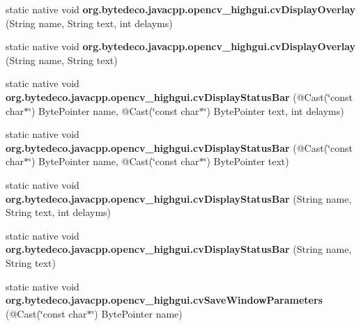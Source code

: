 \begin{DoxyCompactItemize}
\mbox{\label{group__highgui__c_ga0bcf160db70e69d8f716b78eb9a768bb}} 
static native void {\bfseries org.\+bytedeco.\+javacpp.\+opencv\+\_\+highgui.\+cv\+Display\+Overlay} (String name, String text, int delayms)
\item 
\mbox{\label{group__highgui__c_ga0cbee73ab5e6cb1201751f09c27f4425}} 
static native void {\bfseries org.\+bytedeco.\+javacpp.\+opencv\+\_\+highgui.\+cv\+Display\+Overlay} (String name, String text)
\item 
\mbox{\label{group__highgui__c_ga50a2713aef8af8f068cb8eca970b70dc}} 
static native void {\bfseries org.\+bytedeco.\+javacpp.\+opencv\+\_\+highgui.\+cv\+Display\+Status\+Bar} (@Cast(\char`\"{}const char$\ast$\char`\"{}) Byte\+Pointer name, @Cast(\char`\"{}const char$\ast$\char`\"{}) Byte\+Pointer text, int delayms)
\item 
\mbox{\label{group__highgui__c_ga38e4ec523798943980fb7e846dd2cb3c}} 
static native void {\bfseries org.\+bytedeco.\+javacpp.\+opencv\+\_\+highgui.\+cv\+Display\+Status\+Bar} (@Cast(\char`\"{}const char$\ast$\char`\"{}) Byte\+Pointer name, @Cast(\char`\"{}const char$\ast$\char`\"{}) Byte\+Pointer text)
\item 
\mbox{\label{group__highgui__c_ga19067247a51582fb4e0cfd10b1d5c00e}} 
static native void {\bfseries org.\+bytedeco.\+javacpp.\+opencv\+\_\+highgui.\+cv\+Display\+Status\+Bar} (String name, String text, int delayms)
\item 
\mbox{\label{group__highgui__c_ga9a04abd228f7bf050ea9dcbb7d201c5d}} 
static native void {\bfseries org.\+bytedeco.\+javacpp.\+opencv\+\_\+highgui.\+cv\+Display\+Status\+Bar} (String name, String text)
\item 
\mbox{\label{group__highgui__c_ga6ffe6d97cbb163618282ae962afddd6d}} 
static native void {\bfseries org.\+bytedeco.\+javacpp.\+opencv\+\_\+highgui.\+cv\+Save\+Window\+Parameters} (@Cast(\char`\"{}const char$\ast$\char`\"{}) Byte\+Pointer name)
\item 
\mbox{\label{group__highgui__c_gac0a9166d69af844c45b06ed4dcaeae23}} 

\end{DoxyCompactItemize}
